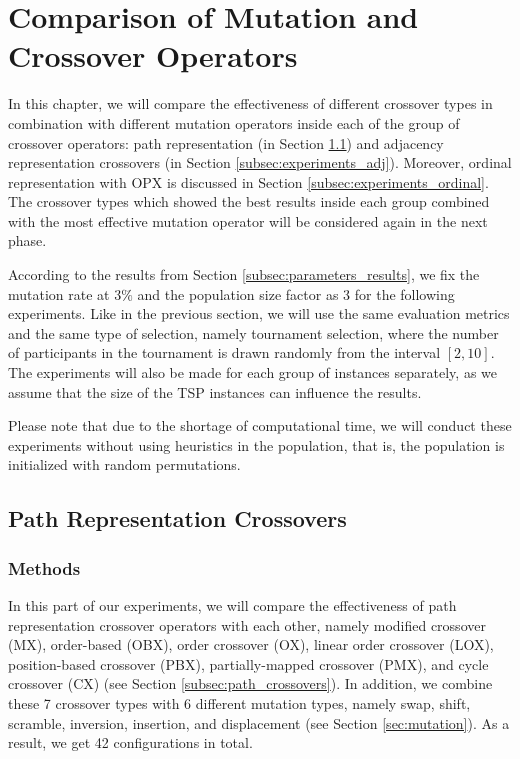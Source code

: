 \section{Comparison of Mutation and Crossover Operators}
\label{exp_crossovers}

In this chapter, we will compare the effectiveness of different crossover types in combination with different mutation operators inside each of the group of crossover operators: path representation (in Section \ref{subsec:experiments_path}) and adjacency representation crossovers (in Section \ref{subsec:experiments_adj}). Moreover, ordinal representation with OPX is discussed in Section \ref{subsec:experiments_ordinal}. The crossover types which showed the best results inside each group combined with the most effective mutation operator will be considered again in the next phase.\par

 According to the results from Section \ref{subsec:parameters_results}, we fix the mutation rate at 3$\%$ and the population size factor as 3 for the following experiments. Like in the previous section, we will use the same evaluation metrics and the same type of selection, namely tournament selection, where the number of participants in the tournament is drawn randomly from the interval $[2, 10]$. The experiments will also be made for each group of instances separately, as we assume that the size of the TSP instances can influence the results.\par 

Please note that due to the shortage of computational time, we will conduct these experiments without using heuristics in the population, that is, the population is initialized with random permutations.\par  


\subsection{Path Representation Crossovers}
\label{subsec:experiments_path}

\subsubsection{Methods}

In this part of our experiments, we will compare the effectiveness of path representation crossover operators with each other, namely modified crossover (MX), order-based (OBX), order crossover (OX), linear order crossover (LOX), position-based crossover (PBX), partially-mapped crossover (PMX), and cycle crossover (CX) (see Section \ref{subsec:path_crossovers}). In addition, we combine these 7 crossover types with 6 different mutation types, namely swap, shift, scramble, inversion, insertion, and displacement (see Section \ref{sec:mutation}).  As a result, we get 42 configurations in total.  \par 


